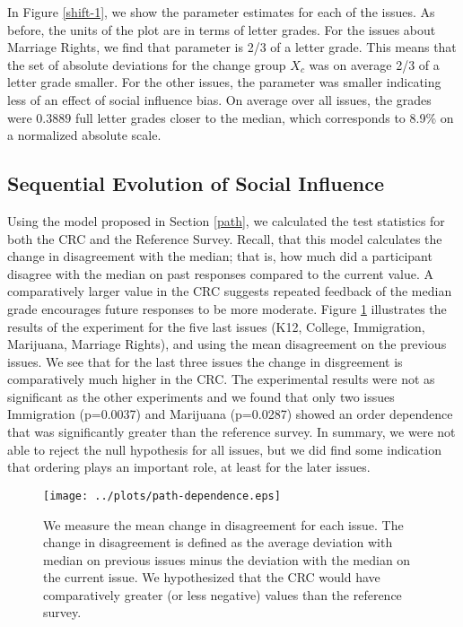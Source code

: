 In Figure \ref{shift-1}, we show the parameter estimates for each of the issues.
As before, the units of the plot are in terms of letter grades.
For the issues about Marriage Rights, we find that parameter is 2/3 of a letter grade.
This means that the set of absolute deviations for the change group $X_c$ was on average 2/3 of a letter grade smaller.
For the other issues, the parameter was smaller indicating less of an effect of social influence bias.
On average over all issues, the grades were $0.3889$ full letter grades closer to the median, which corresponds to 8.9\% on a normalized absolute scale.

\subsection{Sequential Evolution of Social Influence}
Using the model proposed in Section \ref{path}, we calculated the test statistics for both the CRC and the Reference Survey.
Recall, that this model calculates the change in disagreement with the median; that is, how much did a participant disagree with the median on past responses compared 
to the current value.
A comparatively larger value in the CRC suggests repeated feedback of the median grade encourages future responses to be more moderate.
Figure \ref{path-1} illustrates the results of the experiment for the five last issues (K12, College, Immigration, Marijuana, Marriage Rights), and using the mean disagreement on the previous issues.
We see that for the last three issues the change in disgreement is comparatively much higher in the CRC.
The experimental results were not as significant as the other experiments and we found that only two issues Immigration (p=0.0037) and Marijuana (p=0.0287) showed an order dependence that was significantly greater than the reference survey.
In summary, we were not able to reject the null hypothesis for all issues, but we did find some indication that ordering plays an important role, at least for the later issues.

\begin{figure}[h]
	\centering
    \texttt{[image: ../plots/path-dependence.eps]}
      \caption{We measure the mean change in disagreement for each issue. The change in disagreement is defined as the average deviation with median on previous issues minus the deviation with the median on the current issue. We hypothesized that the CRC would have comparatively greater (or less negative) values than the reference survey.}
      \label{path-1}
\end{figure}

